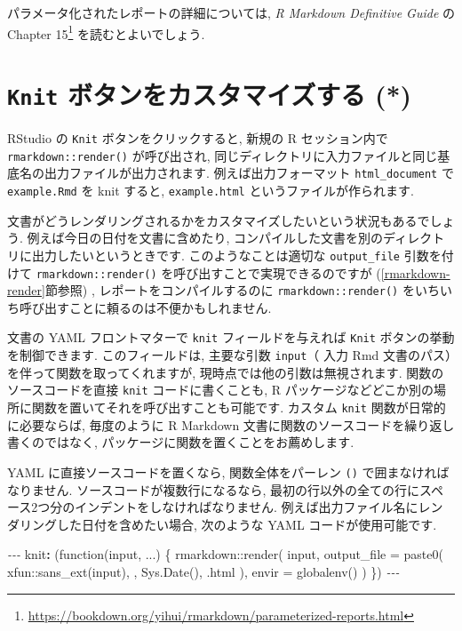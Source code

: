 \documentclass[
  11pt,
  lualatex,
  ja=standard]{bxjsreport}
\newenvironment{Shaded}{\begin{snugshade}}{\end{snugshade}}
\newcommand{\AttributeTok}[1]{\textcolor[rgb]{0.77,0.63,0.00}{#1}}
\newcommand{\FunctionTok}[1]{\textcolor[rgb]{0.00,0.00,0.00}{#1}}
\newcommand{\KeywordTok}[1]{\textcolor[rgb]{0.13,0.29,0.53}{\textbf{#1}}}
\newcommand{\PreprocessorTok}[1]{\textcolor[rgb]{0.56,0.35,0.01}{\textit{#1}}}
\renewcommand{\href}[2]{#2\footnote{\url{#1}}}
\begin{document}
パラメータ化されたレポートの詳細については, \emph{R Markdown Definitive Guide} \autocite{rmarkdown2018} の \href{https://bookdown.org/yihui/rmarkdown/parameterized-reports.html}{Chapter 15} を読むとよいでしょう.

\hypertarget{custom-knit}{%
\section{\texorpdfstring{\texttt{Knit} ボタンをカスタマイズする (*)}{Knit ボタンをカスタマイズする (*)}}\label{custom-knit}}

RStudio の \texttt{Knit} ボタンをクリックすると, 新規の R セッション内で \texttt{rmarkdown::render()} が呼び出され, 同じディレクトリに入力ファイルと同じ基底名の出力ファイルが出力されます. 例えば出力フォーマット \texttt{html\_document} で \texttt{example.Rmd} を knit すると, \texttt{example.html} というファイルが作られます.

文書がどうレンダリングされるかをカスタマイズしたいという状況もあるでしょう. 例えば今日の日付を文書に含めたり, コンパイルした文書を別のディレクトリに出力したいというときです. このようなことは適切な \texttt{output\_file} 引数を付けて \texttt{rmarkdown::render()} を呼び出すことで実現できるのですが (\ref{rmarkdown-render}節参照) , レポートをコンパイルするのに \texttt{rmarkdown::render()} をいちいち呼び出すことに頼るのは不便かもしれません.

文書の YAML フロントマターで \texttt{knit} フィールドを与えれば \texttt{Knit} ボタンの挙動を制御できます. このフィールドは, 主要な引数 \texttt{input}（ 入力 Rmd 文書のパス）を伴って関数を取ってくれますが, 現時点では他の引数は無視されます. 関数のソースコードを直接 \texttt{knit} コードに書くことも, R パッケージなどどこか別の場所に関数を置いてそれを呼び出すことも可能です. カスタム \texttt{knit} 関数が日常的に必要ならば, 毎度のように R Markdown 文書に関数のソースコードを繰り返し書くのではなく, パッケージに関数を置くことをお薦めします.

YAML に直接ソースコードを置くなら, 関数全体をパーレン \texttt{()} で囲まなければなりません. ソースコードが複数行になるなら, 最初の行以外の全ての行にスペース2つ分のインデントをしなければなりません. 例えば出力ファイル名にレンダリングした日付を含めたい場合, 次のような YAML コードが使用可能です.

\begin{Shaded}
\begin{Highlighting}[]
\PreprocessorTok{{-}{-}{-}}
\FunctionTok{knit}\KeywordTok{:}\AttributeTok{ (function(input, ...) \{}
\AttributeTok{    rmarkdown::render(}
\AttributeTok{      input,}
\AttributeTok{      output\_file = paste0(}
\AttributeTok{        xfun::sans\_ext(input), \textquotesingle{}{-}\textquotesingle{}, Sys.Date(), \textquotesingle{}.html\textquotesingle{}}
\AttributeTok{      ),}
\AttributeTok{      envir = globalenv()}
\AttributeTok{    )}
\AttributeTok{  \})}
\PreprocessorTok{{-}{-}{-}}
\end{Highlighting}
\end{Shaded}
\end{document}
